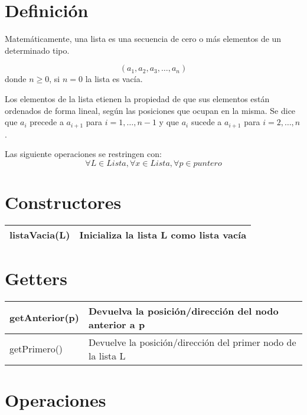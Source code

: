 \documentclass{article}
\begin{document}
    \section*{Definición}

    \LARGE
    Matemáticamente, una lista es una secuencia de cero o más elementos
    de un determinado tipo.

    $$ (a_1, a_2, a_3, \dots, a_n) $$
    donde $ n \ge 0 $, si $ n = 0 $ la lista es vacía.

    Los elementos de la lista etienen la propiedad de que sus elementos están ordenados de forma lineal, según las posiciones que ocupan en la misma. Se dice que $ a_i $ precede a $ a_{i + 1} $ para $ i = 1, \dots, n - 1 $ y que $ a_i $ sucede a $ a_{i + 1} $ para $ i = 2, \dots, n $.

    Las siguiente operaciones se restringen con:
    $$ \forall L \in Lista, \forall x \in Lista, \forall p \in puntero $$

    \Large
    \section*{Constructores}

    \begin{center}
        \begin{tabular}{|l|l|}
            \hline
            listaVacia(L) & Inicializa la lista L como lista vacía \\
            \hline
        \end{tabular}
    \end{center}

    \section*{Getters}

    \begin{center}
        \begin{tabular}{|l|l|}
            \hline
            getAnterior(p) & Devuelva la posición/dirección del nodo anterior a p \\
            \hline
            getPrimero() & Devuelve la posición/dirección del primer nodo de la lista L \\
            \hline
        \end{tabular}
    \end{center}

    \section*{Operaciones}
\end{document}
